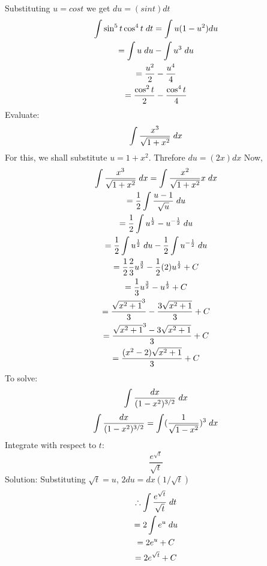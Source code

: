 \documentclass{article}
\begin{document}
Substituting $u=cos t$ we get $du=(sin t)dt$
\begin{gather*}
    \int \sin^5 t \cos^4t\hspace{1mm}dt=\int u(1-u^2)du
   \\ =\int u \hspace{1mm} du -\int u^3 \hspace{1mm} du
   \\ = \frac{u^2}{2}-\frac{u^4}{4}
    \\=\frac{\cos^2t}{2}-\frac{\cos^4t}{4}
\end{gather*}
Evaluate: $$\int \frac{x^3}{\sqrt{1+x^2}}\hspace{1mm} dx$$
For this, we shall substitute $u=1+x^2$. Threfore $du=(2x)dx$ Now,
\begin{gather*}
\int \frac{x^3}{\sqrt{1+x^2}}\hspace{1mm} dx = \int \frac{x^2}{\sqrt{1+x^2}}x\hspace{1mm} dx
\\=\frac{1}{2}\int \frac{u-1}{\sqrt{u}}\hspace{1mm} du
\\=\frac{1}{2}\int u^{\frac{1}{2}}-u^{-\frac{1}{2}}\hspace{1mm} du
\\=\frac{1}{2}\int u^{\frac{1}{2}}\hspace{1mm} du -\frac{1}{2}\int u^{-\frac{1}{2}}\hspace{1mm} du
\\=\frac{1}{2}\frac{2}{3}u^{\frac{3}{2}}-\frac{1}{2}(2) u^{\frac{1}{2}}+C
\\=\frac{1}{3}u^{\frac{3}{2}}- u^{\frac{1}{2}}+C
\\=\frac{\sqrt{x^2+1}^3}{3}-\frac{3\sqrt{x^2+1}}{3}+C
\\=\frac{\sqrt{x^2+1}^3-3\sqrt{x^2+1}}{3}+C
\\=\frac{(x^2-2)\sqrt{x^2+1}}{3}+C
\end{gather*}
To solve: $$\int \frac{dx}{(1-x^2)^{3/2}}\hspace{1mm}dx$$
\begin{gather*}
    \int \frac{dx}{(1-x^2)^{3/2}}=\int (\frac{1}{\sqrt{1-x^2}})^3 \hspace{1mm}{dx}
\end{gather*}
Integrate with respect to $t$: $$\frac{e^{\sqrt{t}}}{\sqrt{t}}$$
Solution: Substituting $\sqrt{t}=u$, $2du=dx(1/\sqrt{t})$
\begin{gather*}
    \therefore \int \frac{e^{\sqrt{t}}}{\sqrt{t}}\hspace{1mm}dt
    \\=2\int e^u \hspace{1mm}du
    \\=2e^u+C
    \\=2e^{\sqrt{t}}+C
\end{gather*}
\end{document}
